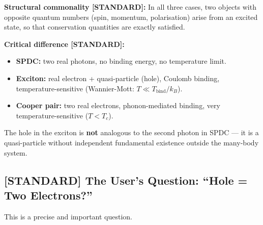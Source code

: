 \begin{center}
\end{center}

\textbf{Structural commonality [STANDARD]:}
In all three cases, two objects with opposite quantum numbers
(spin, momentum, polarisation) arise from an excited state,
so that conservation quantities are exactly satisfied.

\textbf{Critical difference [STANDARD]:}
\begin{itemize}
  \item \textbf{SPDC:} two real photons, no binding energy,
    no temperature limit.
  \item \textbf{Exciton:} real electron + quasi-particle (hole),
    Coulomb binding, temperature-sensitive (Wannier-Mott: $T \ll T_\text{bind}/k_B$).
  \item \textbf{Cooper pair:} two real electrons, phonon-mediated
    binding, very temperature-sensitive ($T < T_c$).
\end{itemize}

The hole in the exciton is \textbf{not} analogous to the second photon
in SPDC --- it is a quasi-particle without independent
fundamental existence outside the many-body system.

\subsection{[STANDARD] The User's Question: ``Hole = Two Electrons?''}

This is a precise and important question.

